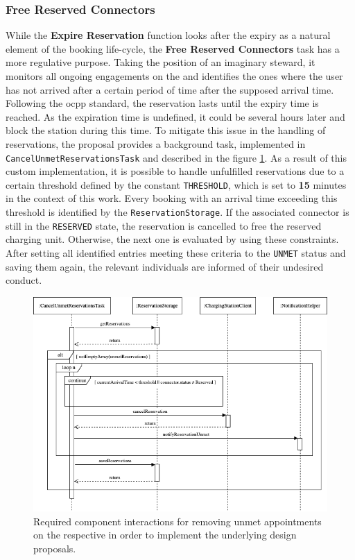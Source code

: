\newpage

\subsubsection{Free Reserved Connectors}
\label{ch:Implementation:sec:Reservation System:ssec:Scheduling Capabilities:sssec:Free Reserved Connectors}

While the \textbf{Expire Reservation} function looks after the expiry as a natural element of the booking life-cycle, the \textbf{Free Reserved Connectors} task has a more regulative purpose.
Taking the position of an imaginary steward, it monitors all ongoing engagements on the  and identifies the ones where the user has not arrived after a certain period of time after the supposed arrival time.
Following the \acrshort{ocpp} standard, the reservation lasts until the expiry time is reached. As the expiration time is undefined, it could be several hours later and block the station during this time. 
To mitigate this issue in the handling of reservations, the proposal provides a background task, implemented in \texttt{CancelUnmetReservationsTask} and described in the figure \ref{fig:free-connector-seqflow}.
As a result of this custom implementation, it is possible to handle unfulfilled reservations due to a certain threshold defined by the constant \texttt{THRESHOLD}, which is set to \textbf{15} minutes in the context of this work.
Every booking with an arrival time exceeding this threshold is identified by the \texttt{ReservationStorage}. If the associated connector is still in the \texttt{RESERVED} state, the reservation is cancelled to free the reserved charging unit.
Otherwise, the next one is evaluated by using these constraints.
After setting all identified entries meeting these criteria to the \texttt{UNMET} status and saving them again, the relevant individuals are informed of their undesired conduct.

\begin{figure}[h]
    \centering
    \includegraphics[scale=0.5]{resources/images/main/6_implementation/processes/scheduler/CancelUnmetReservation.png}
    \caption{Required component interactions for removing unmet appointments on the respective  in order to implement the underlying design proposals.}
    \label{fig:free-connector-seqflow}
\end{figure}

